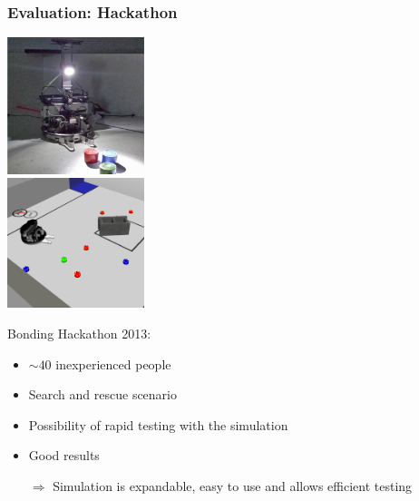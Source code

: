 \documentclass[]{beamer}
\begin{document}
\begin{frame}
  \frametitle{Evaluation: Hackathon}
  \begin{multicols}{2}
    \center
    \includegraphics[width=0.3\textwidth]{../pics/hackathon_real_de}\\
    \includegraphics[width=0.3\textwidth]{../pics/hackathon_sim}\\
    \raggedright
    Bonding Hackathon 2013:
    \begin{itemize}
    \item $\sim 40$ inexperienced people 
    \item Search and rescue scenario
    \item Possibility of rapid testing with the simulation
    \item Good results
    \item[$\Rightarrow$] Simulation is expandable, easy to use and allows efficient testing
    \end{itemize}
  \end{multicols}
\end{frame}
\end{document}
